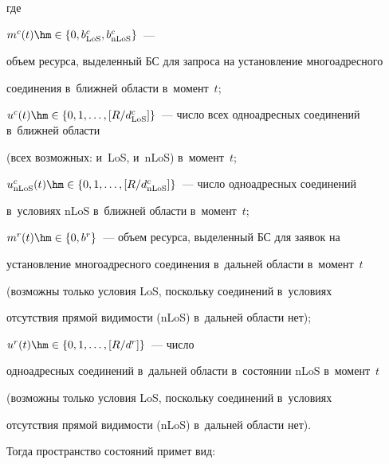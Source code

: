 где 



$m^c(t)\hm\in \{ 0, b^c_{\mathrm{LoS}}, b^c_{\mathrm{nLoS}}\}$~--- 

объем ресурса, выделенный БС для запроса на установление многоадресного 

соединения в~ближ\-ней об\-ласти в~момент~$t$;


$u^c(t)\hm\in \left\{ 0,1,\ldots , \left[ R/d^c_{\mathrm{LoS}} 

\right]\right\}$~--- чис\-ло всех одноадресных соединений в~ближней об\-ласти 

(всех возможных: и~LoS, и~nLoS) в~момент~$t$;


$u^c_{\mathrm{nLoS}}(t)\hm\in \left\{ 0,1,\ldots , \left[ 

R/d^c_{\mathrm{nLoS}} \right]\right\}$~---  чис\-ло одноадресных соединений 

в~условиях nLoS в~ближ\-ней об\-ласти в~момент~$t$;


$m^r(t)\hm\in \{ 0, b^r\}$~--- объем ресурса, выделенный БС для заявок на 

установление многоадресного соединения в~дальней об\-ласти в~момент~$t$ 

(возможны только условия LoS, поскольку соединений в~условиях 

отсутствия прямой ви\-ди\-мости (nLoS) в~дальней области нет);


$u^r(t)\hm\in \left\{ 0,1,\ldots , \left[ R/d^r\right]\right\}$~--- число 

одноадресных соединений в~дальней об\-ласти в~со\-сто\-янии nLoS в~момент~$t$ 

(возможны только условия LoS, поскольку со\-еди\-не\-ний в~условиях 

отсутствия прямой ви\-ди\-мости (nLoS) в~дальней об\-ласти нет).




Тогда пространство состояний примет вид:

